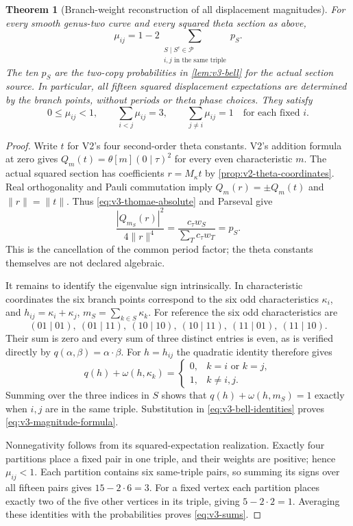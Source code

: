 \documentclass[11pt]{article}
\newtheorem{theorem}{Theorem}[section]
\theoremstyle{definition}
\theoremstyle{remark}
\newcommand{\norm}[1]{\lVert#1\rVert}
\begin{document}
\begin{theorem}[Branch-weight reconstruction of all displacement magnitudes]
\label{thm:v3-thomae-source}
For every smooth genus-two curve and every squared theta section as above,
\begin{equation}
 \boxed{\displaystyle
 \mu_{ij}=1-2\sum_{\substack{S\mid S^c\in\mathcal P\\
                      i,j\text{ in the same triple}}}p_S.}
 \label{eq:v3-magnitude-formula}
\end{equation}
The ten $p_S$ are the two-copy probabilities in \cref{lem:v3-bell} for the
actual section source. In particular, all fifteen squared displacement
expectations are determined by the branch points, without periods or theta
phase choices. They satisfy
\begin{equation}
 0\le\mu_{ij}<1,\qquad
 \sum_{i<j}\mu_{ij}=3,\qquad
 \sum_{j\ne i}\mu_{ij}=1\quad\text{for each fixed }i.
 \label{eq:v3-sums}
\end{equation}
\end{theorem}
\begin{proof}
Write $t$ for V2's four second-order theta constants. V2's addition formula
at zero gives
$Q_m(t)=\theta[m](0\mid\tau)^2$ for every even characteristic $m$.
The actual squared section has coefficients $r=M_\kappa t$ by
\cref{prop:v2-theta-coordinates}. Real orthogonality and Pauli commutation
imply $Q_m(r)=\pm Q_m(t)$ and $\norm r=\norm t$. Thus
\eqref{eq:v3-thomae-absolute} and Parseval give
\[
 \frac{|Q_{m_S}(r)|^2}{4\norm r^4}
 =\frac{c_\tau w_S}{\sum_Tc_\tau w_T}=p_S.
\]
This is the cancellation of the common period factor; the theta constants
themselves are not declared algebraic.

It remains to identify the eigenvalue sign intrinsically. In characteristic
coordinates the six branch points correspond to the six odd
characteristics $\kappa_i$, and
$h_{ij}=\kappa_i+\kappa_j$, $m_S=\sum_{k\in S}\kappa_k$.
For reference the six odd characteristics are
\[
 (01\mid01),\ (01\mid11),\ (10\mid10),\ (10\mid11),\
 (11\mid01),\ (11\mid10).
\]
Their sum is zero and every sum of three distinct entries is even, as is
verified directly by $q(\alpha,\beta)=\alpha\cdot\beta$.
For $h=h_{ij}$ the quadratic identity therefore gives
\[
 q(h)+\omega(h,\kappa_k)
 =\begin{cases}0,&k=i\text{ or }k=j,\\1,&k\ne i,j.\end{cases}
\]
Summing over the three indices in $S$ shows that
$q(h)+\omega(h,m_S)=1$ exactly when $i,j$ are in the same triple.
Substitution in \eqref{eq:v3-bell-identities} proves
\eqref{eq:v3-magnitude-formula}.

Nonnegativity follows from its squared-expectation realization. Exactly
four partitions place a fixed pair in one triple, and their weights are
positive; hence $\mu_{ij}<1$. Each partition contains six same-triple
pairs, so summing its signs over all fifteen pairs gives $15-2\cdot6=3$.
For a fixed vertex each partition places exactly two of the five other
vertices in its triple, giving $5-2\cdot2=1$. Averaging these identities
with the probabilities proves \eqref{eq:v3-sums}.
\end{proof}
\end{document}
